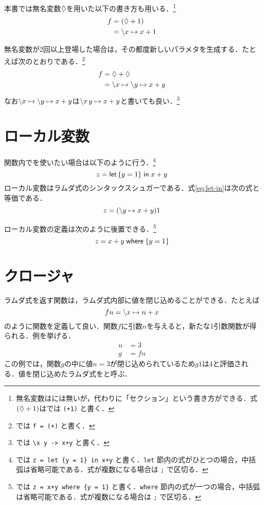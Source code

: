 \documentclass[platex,a5paper,twoside,fleqn,draft]{jsbook}
\newcommand{\keyword}[1]{\textgt{\textbf{#1}}}
\begin{document}
本書では無名変数$\mathord{\lozenge}$を用いた以下の書き方も用いる．\footnote{無名変数は\haskell には無いが，代わりに「セクション」という書き方ができる．式$(\mathord{\lozenge}+1)$は\haskell では \verb|(+1)| と書く．}
\begin{align}
f&=\left(\mathord{\lozenge}+1\right)\\
&=\backslash x\mapsto x+1
\end{align}

無名変数が2回以上登場した場合は，その都度新しいパラメタを生成する．たとえば次のとおりである．\footnote{\haskell では \verb|f = (+)| と書く．}
\begin{align}
f&=\mathord{\lozenge}+\mathord{\lozenge}\\
&=\backslash x\mapsto\backslash y\mapsto x+y
\end{align}
なお$\backslash x\mapsto\backslash y\mapsto x+y$は$\backslash x\,y\mapsto x+y$と書いても良い．\footnote{\haskell では \verb|\x y -> x+y| と書く．}

\section{ローカル変数}

関数内で\keyword{ローカル変数}を使いたい場合は以下のように行う．\footnote{\haskell では \verb|z = let {y = 1} in x+y| と書く．\verb|let| 節内の式がひとつの場合，中括弧は省略可能である．式が複数になる場合は \verb|;| で区切る．}
\begin{equation}
z=\mathord{\textsf{let}}\left\{y=1\right\}\mathrel{\textsf{in}}x+y
\label{eq:let-in}
\end{equation}
ローカル変数はラムダ式のシンタックスシュガーである．式\eqref{eq:let-in}は次の式と等価である．
\begin{equation}
z=(\backslash y\mapsto x+y)1
\end{equation}

ローカル変数の定義は次のように後置できる．\footnote{\haskell では \verb|z = x+y where {y = 1}| と書く．\verb|where| 節内の式が一つの場合，中括弧は省略可能である．式が複数になる場合は \verb|;| で区切る．}
\begin{equation}
z=x+y\mathrel{\textsf{where}}\left\{y=1\right\}
\end{equation}

\section{クロージャ}

ラムダ式を返す関数は，ラムダ式内部に値を閉じ込めることができる．たとえば
\begin{equation}
fn=\backslash x\mapsto n+x
\end{equation}
のように関数を定義して良い．関数$f$に引数$n$を与えると，新たな1引数関数が得られる．例を挙げる．
\begin{align}
n&=3\\
g&=fn
\end{align}
この例では，関数$g$の中に値$n=3$が閉じ込められているため$g1$は$4$と評価される．値を閉じ込めたラムダ式を\keyword{クロージャ}と呼ぶ．
\end{document}
